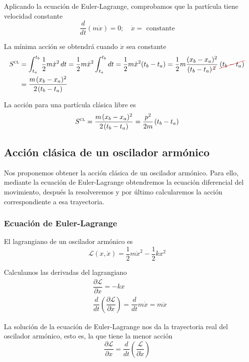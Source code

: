 Aplicando la ecuación de Euler-Lagrange, comprobamos que la partícula
tiene velocidad constante
\[
  \dfrac{d}{dt} (m\dot{x}) = 0
  ;\hspace{1em}
  \dot{x} = \text{ constante}
\]

La mínima acción se obtendrá cuando $\dot{x}$ sea constante
\begin{align*}
  S^{\textsc{cl}}
  &=
  \int_{t_a}^{t_b} \dfrac{1}{2} m\dot{x}^2\,dt
  =
  \dfrac{1}{2} m\dot{x}^2 \int_{t_a}^{t_b} dt
  =
  \dfrac{1}{2}m\dot{x}^2 (t_b-t_a)
  =
    \dfrac{1}{2}m \dfrac{(x_b-x_a)^2}{(t_b-t_a)^{\cancelout{\scriptstyle 2}}}\kern1pt \cancelout{(t_b-t_a)}\\
  &= \dfrac{m\kern1pt (x_b-x_a)^2}{2\kern1pt (t_b-t_a)}
\end{align*}

La acción para una partícula clásica libre es
\begin{equation}\label{eq:accion_clasica_particula_libre}
  S^{\textsc{cl}}
  =
  \dfrac{m\kern1pt (x_b-x_a)^2}{2\kern1pt (t_b-t_a)}
  =
  \dfrac{p^2}{2m}\kern1pt (t_b-t_a)
\end{equation}

\subsection{Acción clásica de un oscilador armónico}
Nos proponemos obtener la acción clásica de un oscilador armónico. Para ello, mediante la ecuación de Euler-Lagrange obtendremos la ecuación diferencial del movimiento, después la resolveremos y por último calcularemos la acción correspondiente a esa trayectoria.

\subsubsection{Ecuación de Euler-Lagrange}
El lagrangiano de un oscilador armónico es
\[
  \mathcal{L}(x,\dot{x})
  =
  \dfrac{1}{2}m\dot{x}^2
  -
  \dfrac{1}{2}kx^2
\]

Calculamos las derivadas del lagrangiano
\begin{align*}
  &\dfrac{\partial\mathcal{L}}{\partial x}
  =
    -kx\\
  &\dfrac{d}{dt}\left(\dfrac{\partial\mathcal{L}}{\partial\dot{x}}\right)
  =
  \dfrac{d}{dt}m\dot{x}
  =
  m\ddot{x}
\end{align*}

La solución de la ecuación de Euler-Lagrange nos da la trayectoria
real del oscilador armónico, esto es, la que tiene la menor acción
\[
  \dfrac{\partial\mathcal{L}}{\partial x}
  =
  \dfrac{d}{dt}\left(\dfrac{\mathcal{L}}{\partial\dot{x}}\right)
\]

